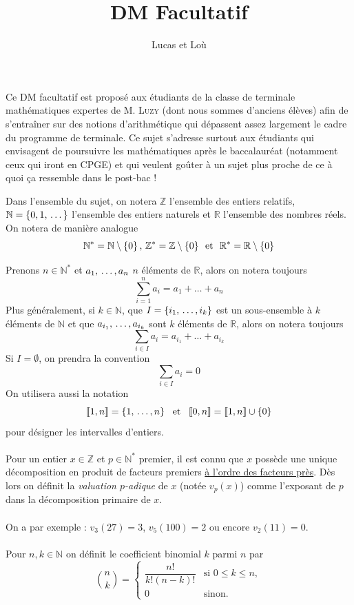 \documentclass{article}
\date{}
\title{\textbf{DM Facultatif}}
\author{Lucas et Loù}
\newcommand{\R}{\mathbb{R}}
\newcommand{\N}{\mathbb{N}}
\newcommand{\Z}{\mathbb{Z}}
\begin{document}
\maketitle

\vspace{0.1 cm}

\noindent Ce DM facultatif est proposé aux étudiants de la classe de terminale mathématiques expertes de \textsc{M. Luzy} (dont nous sommes d'anciens élèves) afin de s'entraîner sur des notions d'arithmétique qui dépassent assez largement le cadre du programme de terminale. Ce sujet s'adresse surtout aux étudiants qui envisagent de poursuivre les mathématiques après le baccalauréat (notamment ceux qui iront en CPGE) et qui veulent goûter à un sujet plus proche de ce à quoi ça ressemble dans le post-bac !

\vspace{0.4 cm}
\noindent\makebox[\textwidth][c]{\rule{\dimexpr\paperwidth-1cm\relax}{0.4pt}}
\vspace{0.4 cm}

\noindent Dans l'ensemble du sujet, on notera $\Z$ l'ensemble des entiers relatifs, $\N = \left \{ 0, 1, \thinspace \dots \right \}$ l'ensemble des entiers naturels et $\R$ l'ensemble des nombres réels. On notera de manière analogue $$\N^* = \N \setminus \left \{ 0 \right \}, \thinspace \Z^* = \Z \setminus \left \{ 0 \right \} \thinspace \text{ et } \thinspace\thinspace \R^* = \R \setminus \left \{ 0 \right \}$$

\noindent Prenons $n \in \N^*$ et $a_1, \thinspace \dots, a_n$ $n$ éléments de $\R$, alors on notera toujours 
$$\sum_{i=1}^n a_i = a_1 + \dots + a_n$$
Plus généralement, si $k \in \N$, que $I = \left \{ i_1, \thinspace \dots, i_k \right \}$ est un sous-ensemble à $k$ éléments de $\N$ et que $a_{i_1}, \thinspace \dots, a_{i_k}$ sont $k$ éléments de $\R$, alors on notera toujours 
$$\sum_{i \in I} a_i = a_{i_1} + \dots + a_{i_k}$$
Si $I = \emptyset$, on prendra la convention 
$$\sum_{i \in I} a_i = 0$$
On utilisera aussi la notation
$$\llbracket 1, n \rrbracket = \left \{ 1, \thinspace \dots, n \right \} \thinspace \thinspace \text{ et } \thinspace \thinspace \thinspace \llbracket 0, n \rrbracket =  \llbracket 1, n \rrbracket \cup \left \{ 0 \right \}$$
pour désigner les intervalles d'entiers.\\
\\
Pour un entier $x \in \Z$ et $p \in \N^*$ premier, il est connu que $x$ possède une unique décomposition en produit de facteurs premiers \underline{à l'ordre des facteurs près}. Dès lors on définit la \textit{valuation $p$-adique} de $x$ (notée $v_p(x)$) comme l'exposant de $p$ dans la décomposition primaire de $x$.\\
\\
On a par exemple : \thinspace $v_3(27) = 3$, \thinspace $v_5(100) = 2$ ou encore $v_2(11) = 0$.\\
\\
Pour $n,k \in \N$ on définit le coefficient binomial $k$ parmi $n$ par 
\[
\binom{n}{k} = \begin{cases} 
\dfrac{n!}{k!(n-k)!} & \text{si } 0 \le k \le n, \\[10pt]
0 & \text{sinon.}
\end{cases}
\]
\end{document}
